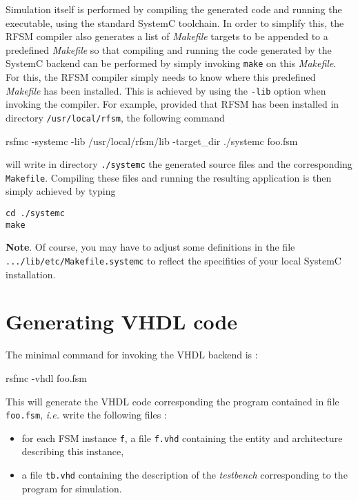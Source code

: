 Simulation itself is performed by compiling the generated code and running the executable,
using the standard SystemC toolchain.
In order to simplify this, the RFSM compiler also generates a list of \emph{Makefile} targets to be
appended to a predefined \emph{Makefile} so that compiling and running the code generated by the
SystemC backend can be performed by simply invoking \verb|make| on this \emph{Makefile}. For this,
the RFSM compiler simply needs to know where this predefined \emph{Makefile} has been
installed. This is achieved by using the \verb|-lib| option when invoking the compiler. For example,
provided that RFSM has been installed in directory \verb|/usr/local/rfsm|, the following command

\begin{example}
rsfmc -systemc -lib /usr/local/rfsm/lib -target_dir ./systemc  foo.fsm  
\end{example}

will write in directory \verb|./systemc| the generated source files and the corresponding
\verb|Makefile|. Compiling these files and running the resulting application is then simply achieved
by typing

\begin{verbatim}
cd ./systemc
make 
\end{verbatim}

\medskip
\textbf{Note}. Of course, you may have to adjust some definitions in the file
\verb|.../lib/etc/Makefile.systemc| to reflect the specifities of your local SystemC installation. 

\section{Generating VHDL code}
\label{sec:generating-vhdl-code}

The minimal command for invoking the VHDL backend is :

\begin{example}
rsfmc -vhdl foo.fsm  
\end{example}

This will  generate the VHDL code corresponding the program contained in file
\texttt{foo.fsm}, \emph{i.e.} write the following files :

\begin{itemize}
\item for each FSM instance \verb|f|, a file \verb|f.vhd| containing the
  entity and architecture describing this instance,
\item a file \verb|tb.vhd| containing the description of the \emph{testbench} corresponding to the
  program for simulation.
\end{itemize}

